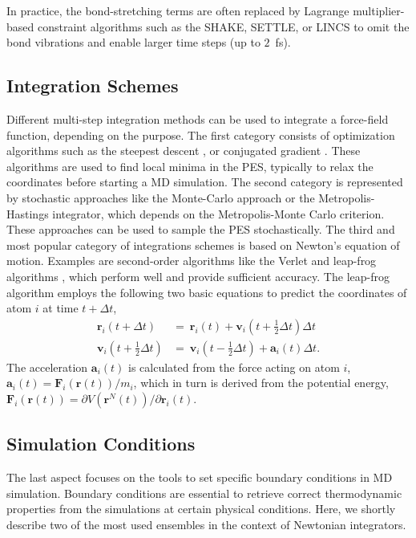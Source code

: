 In practice, the bond-stretching terms are often replaced by Lagrange multiplier-based constraint algorithms such as the SHAKE\cite{Ryckaert1977, Ciccotti1986}, SETTLE,\cite{Miyamoto1992} or LINCS\cite{Hess1997} to omit the bond vibrations and enable larger time steps (up to $2$~fs). \cite{Ryckaert1977}


\subsection{Integration Schemes}
Different multi-step integration methods can be used to integrate a force-field function, depending on the purpose. 
%
The first category consists of optimization algorithms such as the steepest descent \cite{Debye1909}, or conjugated gradient \cite{Hestenes1952}. These algorithms are used to find local minima in the PES, typically to relax the coordinates before starting a MD simulation.\cite{Cazals2015}
The second category is represented by stochastic approaches like the Monte-Carlo approach or the Metropolis-Hastings integrator\cite{Hastings1970}, which depends on the Metropolis-Monte Carlo criterion\cite{Metropolis1953}. These approaches can be used to sample the PES stochastically. 
The third and most popular category of integrations schemes is based on Newton's equation of motion\cite{Newton1726, Cohen1999}. 
Examples are second-order algorithms like the Verlet and leap-frog algorithms \cite{Hockney1970}, which perform well and provide sufficient accuracy.\cite{Gunsteren1990, Leimkuhler1996}
The leap-frog algorithm employs the following two basic equations to predict the coordinates of atom $i$ at time $t+ \Delta t$,
\begin{equation}
    \begin{split}
        \textbf{r}_i(t+\Delta t)&=~\textbf{r}_i(t)+\textbf{v}_i(t+\frac{1}{2} \Delta t) \Delta t \\
        \textbf{v}_i(t+\frac{1}{2} \Delta t)&=~\textbf{v}_i(t - \frac{1}{2} \Delta t)+\textbf{a}_i(t) \Delta t.
    \end{split}
\end{equation}
The acceleration $\textbf{a}_i(t)$ is calculated from the force acting on atom $i$, $\textbf{a}_i(t) = \textbf{F}_i(\textbf{r}(t))/m_i$, which in turn is derived from the potential energy, $\textbf{F}_i(\textbf{r}(t)) = \partial V(\textbf{r}^N(t))/ \partial \textbf{r}_i(t)$.\cite{Gunsteren1990}

 
\subsection{Simulation Conditions}
The last aspect focuses on the tools to set specific boundary conditions in MD simulation. 
Boundary conditions are essential to retrieve correct thermodynamic properties from the simulations at certain physical conditions. Here, we shortly describe two of the most used ensembles in the context of Newtonian integrators.

